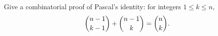 Give a combinatorial proof of Pascal's identity: for integers $1\le k\le n$,
\[
\dbinom{n-1}{k-1}+\dbinom{n-1}{k}=\dbinom{n}{k}.
\]
